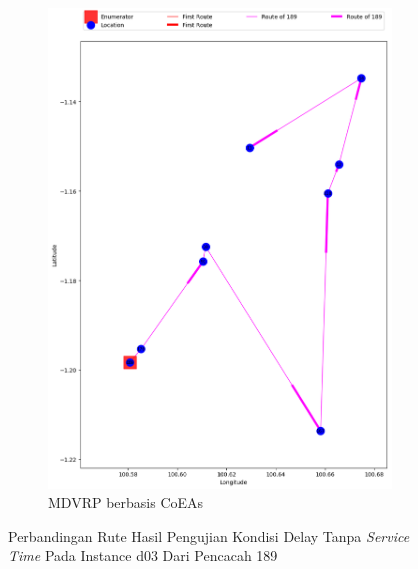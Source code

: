 \begin{figure}[H]
	\centering
	\begin{subfigure}[t]{\textwidth}
		\centering
		\includegraphics[width=\textwidth]{Resources/Images/delayed_3/real_m15_n100_delayed_3_189_coes}
		\caption{MDVRP berbasis CoEAs}
		\label{fig:real_m15_n100_delayed_3_189_coes}
	\end{subfigure}
	\caption{Perbandingan Rute Hasil Pengujian Kondisi Delay Tanpa \textit{Service Time} Pada Instance d03 Dari Pencacah 189}
	\label{fig:real_m15_n100_delayed_3_189}
\end{figure}


